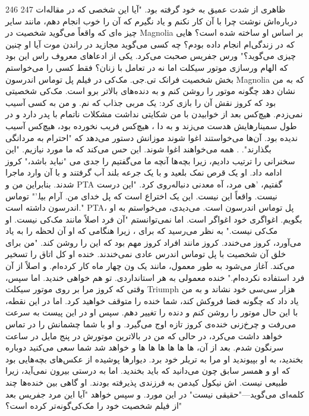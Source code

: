 246
247
ظاهری از شدت عمیق به خود گرفته بود. "آیا این شخصی که در مقاله‌ات درباره‌اش نوشت
چرا با آن کار نکنم و یاد نگیرم که آن را خوب انجام دهم، مانند سایر چیز
ه‌ای که واقعاً می‌گوید شخصیت در Magnolia بر اساس او ساخته شده است؟
هایی که در زندگی‌ام انجام داده بودم؟ چه کسی می‌گوید مجازید در راندن موت
آیا او چنین چیزی می‌گوید؟"
ورس جفریس صحبت می‌کرد. یکی از ادعاهای معروف راس این بود که الهام‌
ورسازی موتور سیکلت اما نه در تعامل با زنان؟ فقط کسی را می‌خواستم
بخش شخصیت فرانک تی.جی. مک‌کی در فیلم پل توماس اندرسون Magnolia
که به من نشان دهد چگونه موتور را روشن کنم و به دنده‌های بالاتر برو
است. مک‌کی شخصیتی بود که کروز نقش آن را بازی کرد: یک مربی جذاب که
نم. و من به کسی آسیب نمی‌زدم. هیچ‌کس بعد از خوابیدن با من شکایتی نداشت
مشکلات ناتمام با پدر دارد و در طول سمینارهایش هدست می‌زند و به دا
، هیچ‌کس فریب نخورده بود، هیچ‌کس آسیب ندیده بود. آن‌ها می‌خواستند اغوا شوند
موزانش دستور می‌دهد که "احترام به مردانگی بگذارند".
. همه می‌خواهند اغوا شوند. این حس می‌کند که ما مورد نیازیم.
"این سخنرانی را ترتیب دادیم، زیرا بچه‌ها آنچه ما می‌گفتیم را جدی می‌
"نباید باشد،" کروز ادامه داد. او یک قرص نمک بلعید و با یک جرعه بلند آب
گرفتند و با آن وارد ماجرا شدند. بنابراین من و PTA گفتیم، 'هی مرد، آه
معدنی دنباله‌روی کرد. "این درست نیست. واقعاً این نیست. این یک اختراع است که پل
خدای من. آرام بیا.'"
توماس اندرسون داشته است." PTA، پل توماس اندرسون است.
می‌دیدی، می‌خواستم به او بگویم. اغواگری خود اغواگر است. اما نمی‌توانستم
"آن فرد اصلاً مانند مک‌کی نیست. او مک‌کی نیست." به نظر می‌رسید که برای
، زیرا هنگامی که او آن لحظه را به یاد می‌آورد، کروز می‌خندد. کروز مانند افراد
کروز مهم بود که این را روشن کند. "من برای خلق آن شخصیت با پل توماس اندرس
عادی نمی‌خندند. خنده او کل اتاق را تسخیر می‌کند. آغاز می‌شود به طور معمول، مانند یک
ون چهار ماه کار کرده‌ام. و اصلاً از آن فرد استفاده نکرده‌ام."
خنده معمولی به هر استانداردی. تو هم خواهی خندید. اما سپس، وقتی که
کروز مرا بر روی موتور سیکلت Triumph هزار سی‌سی خود نشاند و به من یاد داد که چگونه
فضا فروکش کند، شما خنده را متوقف خواهید کرد. اما در این نقطه، با این حال
موتور را روشن کنم و دنده را تغییر دهم. سپس او در این پیست به سرعت می‌رفت و چرخ‌زنی
خنده‌ی کروز تازه اوج می‌گیرد. و او با شما چشمانش را در تماس خواهد داشت
می‌کرد، در حالی که من در بالاترین موتورش در پنج مایل در ساعت سرنگون شدم. بعد از آن،
ها ها ها ها ها ها و خواهد شد شما سعی می‌کنید دوباره بخندید، به او بپیوندید
او مرا به تریلر خود برد. دیوارها پوشیده از عکس‌های بچه‌هایی بود که او و همسر سابق
چون می‌دانید که باید بخندید. اما به درستی بیرون نمی‌آید، زیرا طبیعی نیست.
اش نیکول کیدمن به فرزندی پذیرفته بودند.
او گاهی بین خنده‌ها چند کلمه‌ای می‌گوید—"حقیقی نیست" در این مورد. و سپس خواهد
"آیا این مرد جفریس بعد از فیلم شخصیت خود را مک‌کی‌گونه‌تر کرده است؟"
